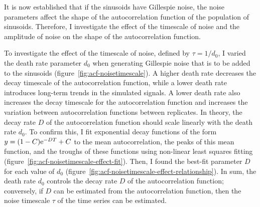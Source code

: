 It is now established that if the sinusoids have Gillespie noise, the noise parameters affect the shape of the autocorrelation function of the population of sinusoids.
Therefore, I investigate the effect of the timescale of noise and the amplitude of noise on the shape of the autocorrelation function.

To investigate the effect of the timescale of noise, defined by $\tau = 1/d_{0}$, I varied the death rate parameter $d_{0}$ when generating Gillespie noise that is to be added to the sinusoids (figure~\ref{fig:acf-noisetimescale}).
A higher death rate decreases the decay timescale of the autocorrelation function, while a lower death rate introduces long-term trends in the simulated signals.
A lower death rate also increases the decay timescale for the autocorrelation function and increases the variation between autocorrelation functions between replicates.
In theory, the decay rate $D$ of the autocorrelation function should scale linearly with the death rate $d_{0}$.
To confirm this, I fit exponential decay functions of the form $y = (1-C)\mathrm{e}^{-DT}+C$ to the mean autocorrelation, the peaks of this mean function, and the troughs of these functions using non-linear least squares fitting (figure~\ref{fig:acf-noisetimescale-effect-fit}).
Then, I found the best-fit parameter $D$ for each value of $d_{0}$ (figure~\ref{fig:acf-noisetimescale-effect-relationship}).
In sum, the death rate $d_{0}$ controls the decay rate $D$ of the autocorrelation function; conversely, if $D$ can be estimated from the autocorrelation function, then the noise timescale $\tau$ of the time series can be estimated.



